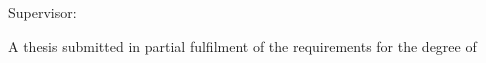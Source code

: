 \begin{titlepage}
  \centering
  \vspace*{18mm}

  {\Large\bfseries \thesistitle\par}

  \vspace{24mm}
  {\large \thesisauthor\par}

  \vfill
  {\large Supervisor: \thesissupervisor\par}

  \vspace{15mm}
  {\normalsize
  A thesis submitted in partial fulfilment of the requirements for the degree of\par
  \vspace{3mm}
  \textbf{\thesisdegree}\par}

  \vspace{18mm}
  {\large \thesisschool\par}
  {\large \thesisuniversity\par}
  {\large \thesiscountry\par}

  \vspace{15mm}
  {\large \thesisdate\par}
\end{titlepage}
